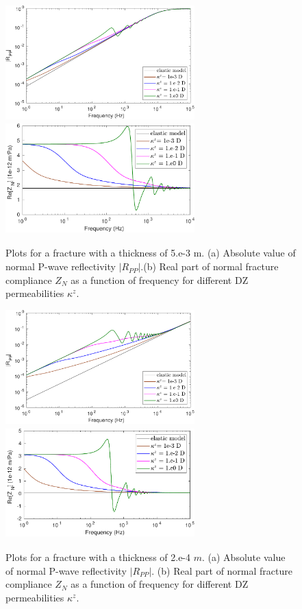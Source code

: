 \documentclass[draft]{agujournal2019}
\begin{document}
\begin{figure}
\centering
    \subcaptionbox{}
      {
       \includegraphics[width=73mm, height=43 mm]{figures/elasporo_5mm_ksen_h20e-2.pdf}
        }
    \subcaptionbox{}
      {
        \includegraphics[width=73mm, height=43mm]{figures/elasporo_5mm_znsen_h20e-2.pdf}
        }
\caption {Plots for a fracture with a thickness of 5.e-3 m. (a) Absolute value of normal P-wave reflectivity $|R_{PP}|$.(b) Real part of normal fracture compliance $Z_N$ as a function of frequency for different DZ permeabilities $\kappa^z$.
}
\label{fig:6}
\end{figure}

\begin{figure}
\centering
    \subcaptionbox{}
      {
       \includegraphics[width=73mm, height=43 mm]{figures/elasporo_02mm_ksen_h20e-2.pdf}
        }
    \subcaptionbox{}
      {
        \includegraphics[width=73mm, height=43mm]{figures/elasporo_02mm_znsen_h20e-2.pdf}
        }
\caption {Plots for a fracture with a thickness of 2.e-4 $m$. (a) Absolute value of normal P-wave reflectivity $|R_{PP}|$. (b) Real part of normal fracture compliance $Z_N$ as a function of frequency for different DZ permeabilities $\kappa^z$.}
\label{fig:7}
\end{figure}
\end{document}
